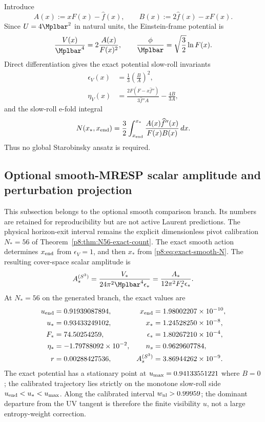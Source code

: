 \documentclass[12pt,a4paper]{article}
\begin{document}
Introduce
\begin{equation}
\label{p8:eq:exact-smooth-AB}
A(x):=xF(x)-\widehat f(x),\qquad
B(x):=2\widehat f(x)-xF(x).
\end{equation}
Since \(U=4\Mplbar^2\) in natural units, the Einstein-frame potential is
\begin{equation}
\label{p8:eq:exact-smooth-potential}
\frac{V(x)}{\Mplbar^4}=2\frac{A(x)}{F(x)^2},
\qquad
\frac\phi{\Mplbar}=\sqrt{\frac32}\ln F(x).
\end{equation}
Direct differentiation gives the exact potential slow-roll invariants
\begin{align}
\label{p8:eq:exact-smooth-epsilon-eta}
\epsilon_V(x)&=\frac13\left(\frac{B}{A}\right)^2,\\
\eta_V(x)&=
\frac{2F(F-x\widehat f'')}{3\widehat f''A}
-\frac{4B}{3A},
\end{align}
and the slow-roll e-fold integral
\begin{equation}
\label{p8:eq:exact-smooth-N}
N(x_*,x_{\rm end})
=\frac32\int_{x_{\rm end}}^{x_*}
\frac{A(x)\widehat f''(x)}{F(x)B(x)}\,dx.
\end{equation}
Thus no global Starobinsky ansatz is required.

\subsection{Optional smooth-MRESP scalar amplitude and perturbation projection}
\label{p8:sec:As-normalization}

This subsection belongs to the optional smooth comparison branch.  Its
numbers are retained for reproducibility but are not active Laurent
predictions.
The physical horizon-exit interval remains the explicit dimensionless pivot
calibration \(N_*=56\) of Theorem~\ref{p8:thm:N56-exact-count}.  The exact
smooth action determines \(x_{\rm end}\) from \(\epsilon_V=1\), and then
\(x_*\) from \eqref{p8:eq:exact-smooth-N}.  The resulting cover-space scalar
amplitude is
\begin{equation}
\label{p8:eq:As-cover}
 A_s^{(S^3)}
 =\frac{V_*}{24\pi^2\Mplbar^4\epsilon_*}
 =\frac{A_*}{12\pi^2F_*^2\epsilon_*}.
\end{equation}
At \(N_*=56\) on the generated branch, the exact values are
\begin{align}
\label{p8:eq:exact-smooth-numerics-summary}
 u_{\rm end}&=0.91939087894,&
 x_{\rm end}&=1.98002207\times10^{-10},\\
 u_*&=0.93433249102,&
 x_*&=1.24528250\times10^{-8},\\
 F_*&=74.50254259,&
 \epsilon_*&=1.80267210\times10^{-4},\\
 \eta_*&=-1.79788092\times10^{-2},&
 n_s&=0.9629607784,\\
 r&=0.00288427536,&
 A_s^{(S^3)}&=3.86944262\times10^{-9}.
\end{align}
The exact potential has a stationary point at
\(u_{\rm max}=0.94133551221\) where \(B=0\); the calibrated trajectory lies
strictly on the monotone slow-roll side \(u_{\rm end}<u_*<u_{\rm max}\).
Along the calibrated interval \(w_{\rm nl}>0.99959\); the dominant departure
from the UV tangent is therefore the finite visibility \(u\), not a large
entropy-weight correction.
\end{document}
